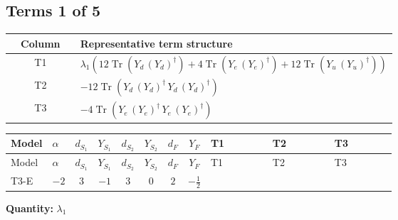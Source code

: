 \documentclass[8pt]{article}
\begin{document}
\begin{landscape}
\subsection*{Terms 1 of 5}
\begin{center}
\begin{tabular}{@{}c >{\raggedright\arraybackslash}p{0.82\linewidth}@{}}
\toprule
Column & Representative term structure \\
\midrule
T1 & \(\displaystyle {\lambda_1} (12 \operatorname{Tr}\!\left({Y_d}\,\left({Y_d}\right)^{\dagger}\right)+4 \operatorname{Tr}\!\left({Y_e}\,\left({Y_e}\right)^{\dagger}\right)+12 \operatorname{Tr}\!\left({Y_u}\,\left({Y_u}\right)^{\dagger}\right))\) \\
\midrule
T2 & \(\displaystyle -12 \operatorname{Tr}\!\left({Y_d}\,\left({Y_d}\right)^{\dagger}\,{Y_d}\,\left({Y_d}\right)^{\dagger}\right)\) \\
\midrule
T3 & \(\displaystyle -4 \operatorname{Tr}\!\left({Y_e}\,\left({Y_e}\right)^{\dagger}\,{Y_e}\,\left({Y_e}\right)^{\dagger}\right)\) \\
\midrule
\bottomrule
\end{tabular}
\end{center}
\smallskip
\tiny
\begin{longtable}{@{}llcccccc >{\raggedright\arraybackslash}p{0.21\linewidth} >{\raggedright\arraybackslash}p{0.21\linewidth} >{\raggedright\arraybackslash}p{0.21\linewidth}@{}}
\toprule
Model & $\alpha$ & $d_{S_1}$ & $Y_{S_1}$ & $d_{S_2}$ & $Y_{S_2}$ & $d_F$ & $Y_F$ & T1 & T2 & T3 \\
\midrule
\endfirsthead
\toprule
Model & $\alpha$ & $d_{S_1}$ & $Y_{S_1}$ & $d_{S_2}$ & $Y_{S_2}$ & $d_F$ & $Y_F$ & T1 & T2 & T3 \\
\midrule
\endhead
T3-E & $-2$ & $3$ & $-1$ & $3$ & $0$ & $2$ & $-\frac{1}{2}$ & \scriptsize\adjustbox{max width=\linewidth}{$\begin{gathered} {\lambda_1} (12 \operatorname{Tr}\!\left({Y_d}\,\left({Y_d}\right)^{\dagger}\right)+4 \operatorname{Tr}\!\left({Y_e}\,\left({Y_e}\right)^{\dagger}\right)+12 \operatorname{Tr}\!\left({Y_u}\,\left({Y_u}\right)^{\dagger}\right))\end{gathered}$} & \scriptsize\adjustbox{max width=\linewidth}{$\begin{gathered} -12 \operatorname{Tr}\!\left({Y_d}\,\left({Y_d}\right)^{\dagger}\,{Y_d}\,\left({Y_d}\right)^{\dagger}\right)\end{gathered}$} & \scriptsize\adjustbox{max width=\linewidth}{$\begin{gathered} -4 \operatorname{Tr}\!\left({Y_e}\,\left({Y_e}\right)^{\dagger}\,{Y_e}\,\left({Y_e}\right)^{\dagger}\right)\end{gathered}$} \\
\midrule
\bottomrule
\end{longtable}
\clearpage
\noindent\textbf{Quantity: }$\lambda_1$\par\smallskip

\end{landscape}
\end{document}
